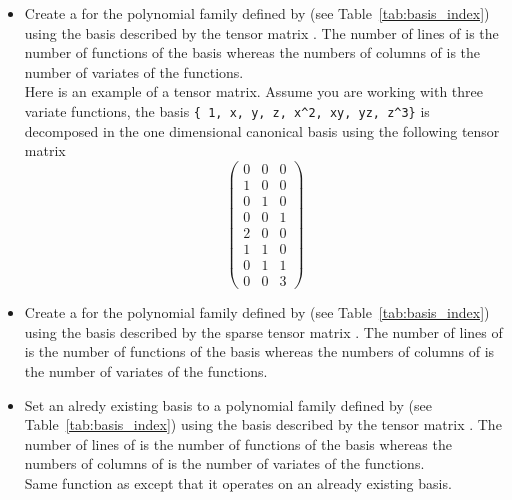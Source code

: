 \begin{itemize}
  \item {}
    \sshortdescribe Create a \PnlBasis for the polynomial family
    defined by  (see Table~\ref{tab:basis_index}) using the basis
    described by the tensor matrix . The number of lines of  is
    the number of functions of the basis whereas the numbers of columns of
     is the number of variates of the functions.
    \\
    Here is an example of a tensor matrix. Assume you are working with three
    variate functions, the basis \verb!{ 1, x, y, z, x^2, xy, yz, z^3}! is
    decomposed in the one dimensional canonical basis using the following tensor
    matrix
    \[ \left(
      \begin{array}{ccc}
        0 & 0 & 0 \\
        1 & 0 & 0 \\
        0 & 1 & 0 \\
        0 & 0 & 1 \\
        2 & 0 & 0 \\
        1 & 1 & 0 \\
        0 & 1 & 1\\
        0 & 0 & 3
      \end{array}
    \right) \]

  \item {}
    \sshortdescribe Create a \PnlBasis for the polynomial family
    defined by  (see Table~\ref{tab:basis_index}) using the basis
    described by the sparse tensor matrix . The number of lines of  is the number of functions of the basis whereas the numbers of columns of  is the number of variates of the functions.

  \item {}
    \sshortdescribe Set an alredy existing basis  to a polynomial family
    defined by  (see Table~\ref{tab:basis_index}) using the basis
    described by the tensor matrix . The number of lines of  is
    the number of functions of the basis whereas the numbers of columns of
     is the number of variates of the functions. \\
    Same function as  except that it
    operates on an already existing basis.

\end{itemize}


